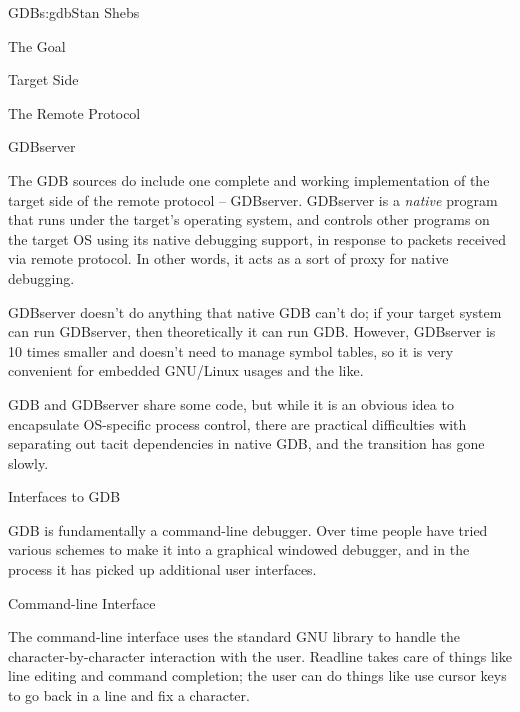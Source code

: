 \begin{aosachapter}{GDB}{s:gdb}{Stan Shebs}
\begin{aosasect1}{The Goal}
\begin{aosasect1}{Target Side}
\begin{aosasect2}{The Remote Protocol}
\end{aosasect2}

\begin{aosasect2}{GDBserver}

The GDB sources do include one complete and working implementation of
the target side of the remote protocol -- GDBserver.  GDBserver is a
{\em native} program that runs under the target's operating system,
and controls other programs on the target OS using its native
debugging support, in response to packets received via remote protocol.
In other words, it acts as a sort of proxy for native debugging.

GDBserver doesn't do anything that native GDB can't do; if your target
system can run GDBserver, then theoretically it can run GDB.  However,
GDBserver is 10 times smaller and doesn't need to manage symbol
tables, so it is very convenient for embedded GNU/Linux usages and the
like.


GDB and GDBserver share some code, but while it is an obvious idea to
encapsulate OS-specific process control, there are practical difficulties
with separating out tacit dependencies in native GDB, and the transition
has gone slowly.

\end{aosasect2}

\end{aosasect1}

\begin{aosasect1}{Interfaces to GDB}

GDB is fundamentally a command-line debugger.  Over time people have
tried various schemes to make it into a graphical windowed debugger,
and in the process it has picked up additional user interfaces.

\begin{aosasect2}{Command-line Interface}

The command-line interface uses the standard GNU library
 to handle the character-by-character interaction with
the user.  Readline takes care of things like line editing and command
completion; the user can do things like use cursor keys to go back in
a line and fix a character.


\end{aosasect2}
\end{aosasect1}
\end{aosasect1}
\end{aosachapter}
